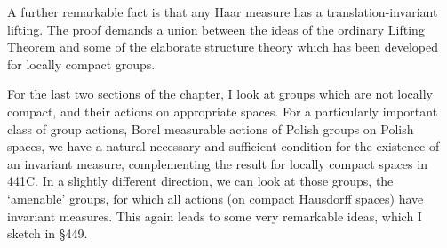 A further remarkable
fact is that any Haar measure has a translation-invariant
lifting.   The proof demands a union between the ideas
of the ordinary Lifting Theorem and some of the
elaborate structure theory which has been developed for locally compact
groups.

For the last two sections of the chapter, I look at groups which are not
locally compact, and their actions on appropriate spaces.
For a particularly important class of group actions, Borel measurable
actions of Polish groups on Polish spaces,
we have a natural necessary and
sufficient condition for the existence of an invariant
measure, complementing the result for locally compact
spaces in 441C.
In a slightly different direction, we can look at those groups, the
`amenable' groups, for which all actions (on compact Hausdorff spaces)
have invariant measures.   This again leads to some very remarkable
ideas, which I sketch in \S449.

\discrpage


